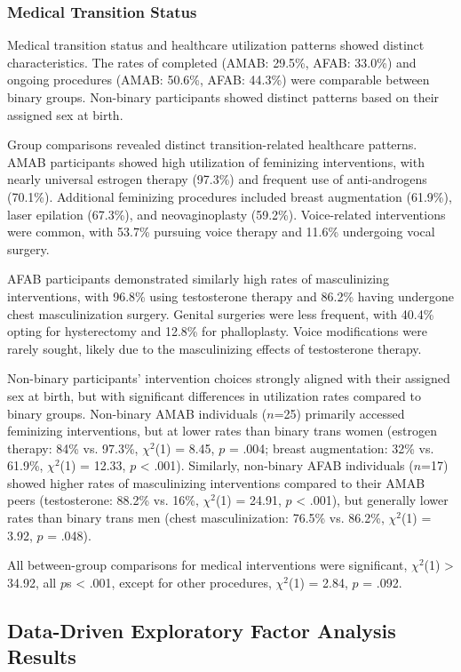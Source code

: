 \documentclass[12pt,a4paper]{article}
\begin{document}
\subsubsection{Medical Transition Status}

Medical transition status and healthcare utilization patterns showed distinct characteristics. The rates of completed (AMAB: 29.5\%, AFAB: 33.0\%) and ongoing procedures (AMAB: 50.6\%, AFAB: 44.3\%) were comparable between binary groups. Non-binary participants showed distinct patterns based on their assigned sex at birth.

Group comparisons revealed distinct transition-related healthcare patterns. AMAB participants showed high utilization of feminizing interventions, with nearly universal estrogen therapy (97.3\%) and frequent use of anti-androgens (70.1\%). Additional feminizing procedures included breast augmentation (61.9\%), laser epilation (67.3\%), and neovaginoplasty (59.2\%). Voice-related interventions were common, with 53.7\% pursuing voice therapy and 11.6\% undergoing vocal surgery.

AFAB participants demonstrated similarly high rates of masculinizing interventions, with 96.8\% using testosterone therapy and 86.2\% having undergone chest masculinization surgery. Genital surgeries were less frequent, with 40.4\% opting for hysterectomy and 12.8\% for phalloplasty. Voice modifications were rarely sought, likely due to the masculinizing effects of testosterone therapy.

Non-binary participants' intervention choices strongly aligned with their assigned sex at birth, but with significant differences in utilization rates compared to binary groups. Non-binary AMAB individuals ($n$=25) primarily accessed feminizing interventions, but at lower rates than binary trans women (estrogen therapy: 84\% vs. 97.3\%, $\chi^2$(1) = 8.45, $p$ = .004; breast augmentation: 32\% vs. 61.9\%, $\chi^2$(1) = 12.33, $p$ < .001). Similarly, non-binary AFAB individuals ($n$=17) showed higher rates of masculinizing interventions compared to their AMAB peers (testosterone: 88.2\% vs. 16\%, $\chi^2$(1) = 24.91, $p$ < .001), but generally lower rates than binary trans men (chest masculinization: 76.5\% vs. 86.2\%, $\chi^2$(1) = 3.92, $p$ = .048).

All between-group comparisons for medical interventions were significant, $\chi^2$(1) > 34.92, all $p$s < .001, except for other procedures, $\chi^2$(1) = 2.84, $p$ = .092.

\subsection{Data-Driven Exploratory Factor Analysis Results}
\end{document}
